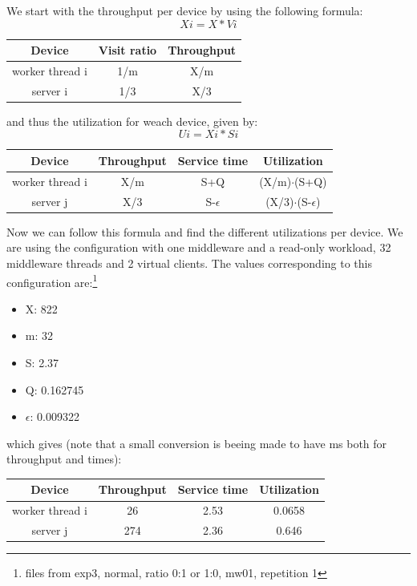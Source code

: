 \documentclass[11pt,a4paper]{article}
\begin{document}
We start with the throughput per device by using the following formula: 
\[Xi = X*Vi\]
 \begin{center}

		\begin{tabular}{|c|c|c|}
			  \hline
			  \textbf{Device} & \textbf{Visit ratio} & \textbf{Throughput} \\
			  \hline
			  worker thread i  & 1/m & X/m \\
			  server i & 1/3 & X/3   \\
			  \hline
		\end{tabular}
 \end{center}
and thus the utilization for weach device, given by:
\[Ui = Xi*Si\]
  \begin{center}

		\begin{tabular}{|c|c|c|c|}
			  \hline
			  \textbf{Device} & \textbf{Throughput} & \textbf{Service time} & \textbf{Utilization} \\
			  \hline
			  worker thread i  &X/m  & S+Q  &(X/m)$\cdot$(S+Q)\\
			  server j & X/3 & S-\(\epsilon \) &(X/3)$\cdot$(S-\(\epsilon \))  \\
			  \hline
		\end{tabular}
 \end{center}
Now we can follow this formula and find the different utilizations per device. We are using the configuration with one middleware and a read-only workload, 32 middleware threads and 2 virtual clients. The values corresponding to this configuration are:\footnote{files from exp3, normal, ratio 0:1 or 1:0, mw01, repetition 1} 
\begin{itemize}
\item X: 822
\item m: 32
\item S: 2.37
\item Q: 0.162745
\item \(\epsilon \): 0.009322
\end{itemize}
which gives (note that a small conversion is beeing made to have ms both for throughput and times):
  \begin{center}
		\begin{tabular}{|c|c|c|c|}
			  \hline
			  \textbf{Device} & \textbf{Throughput} & \textbf{Service time} & \textbf{Utilization} \\
			  \hline
			  worker thread i  &26  & 2.53  &0.0658\\
			  server j & 274 & 2.36 &0.646  \\
			  \hline
		\end{tabular}
 \end{center}
\end{document}
